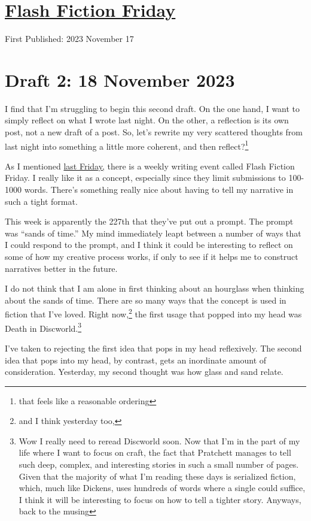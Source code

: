 \documentclass[12pt]{article}[titlepage]
\newcommand{\say}[1]{``#1''}
\newcommand{\1}{\={a}}
\newcommand{\2}{\={e}}
\newcommand{\3}{\={\i}}
\newcommand{\4}{\=o}
\newcommand{\5}{\=u}
\newcommand{\6}{\={A}}
\renewcommand{\,}{\textsuperscript{,}}
\begin{document}
\doublespacing
\section{\href{flash-fiction-227.html}{Flash Fiction Friday}}
First Published: 2023 November 17

\section{Draft 2: 18 November 2023}
I find that I'm struggling to begin this second draft.
On the one hand, I want to simply reflect on what I wrote last night.
On the other, a reflection is its own post, not a new draft of a post.
So, let's rewrite my very scattered thoughts from last night into something a little more coherent, and then reflect?\footnote{that feels like a reasonable ordering}

As I mentioned \href{flash-fiction.html}{last Friday,} there is a weekly writing event called Flash Fiction Friday.
I really like it as a concept, especially since they limit submissions to 100-1000 words.
There's something really nice about having to tell my narrative in such a tight format.

This week is apparently the 227th that they've put out a prompt.
The prompt was \say{sands of time.}
My mind immediately leapt between a number of ways that I could respond to the prompt, and I think it could be interesting to reflect on some of how my creative process works, if only to see if it helps me to construct narratives better in the future.

I do not think that I am alone in first thinking about an hourglass when thinking about the sands of time.
There are so many ways that the concept is used in fiction that I've loved.
Right now,\footnote{and I think yesterday too,} the first usage that popped into my head was Death in Discworld.\footnote{Wow I really need to reread Discworld soon.
Now that I'm in the part of my life where I want to focus on craft, the fact that Pratchett manages to tell such deep, complex, and interesting stories in such a small number of pages.
Given that the majority of what I'm reading these days is serialized fiction, which, much like Dickens, uses hundreds of words where a single could suffice, I think it will be interesting to focus on how to tell a tighter story.
Anyways, back to the musing}

I've taken to rejecting the first idea that pops in my head reflexively.
The second idea that pops into my head, by contrast, gets an inordinate amount of consideration.
Yesterday, my second thought was how glass and sand relate.
\end{document}
